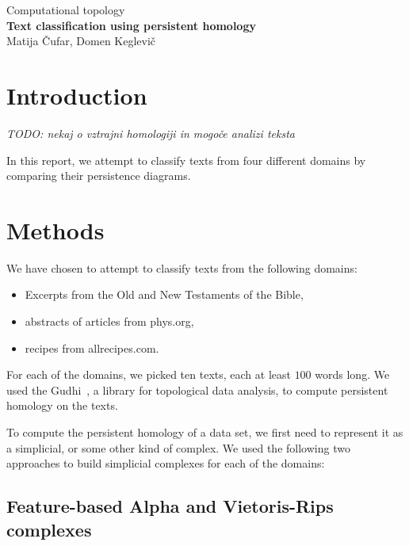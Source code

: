 \documentclass[12pt,a4paper]{amsart}
\begin{document}
\thispagestyle{empty}
\begin{center}{\large
Computational topology\\[4mm]
{\bf Text classification using persistent homology}\\[4mm]
Matija Čufar, Domen Keglevič\\[6mm]
}
\end{center}
\bigskip

\section{Introduction}

\emph{TODO: nekaj o vztrajni homologiji in mogoče analizi teksta}

In this report, we attempt to classify texts from four different domains by
comparing their persistence diagrams.

\section{Methods}

We have chosen to attempt to classify texts from the following domains:

\begin{itemize}
\item Excerpts from the Old and New Testaments of the Bible,
\item abstracts of articles from phys.org,
\item recipes from allrecipes.com.
\end{itemize}


For each of the domains, we picked ten texts, each at least $100$ words long. We
used the Gudhi~\cite{maria2014gudhi}, a library for topological data analysis,
to compute persistent homology on the texts.

To compute the persistent homology of a data set, we first need to represent it
as a simplicial, or some other kind of complex. We used the following two
approaches to build simplicial complexes for each of the domains:

\subsection{Feature-based Alpha and Vietoris-Rips complexes}
\end{document}
